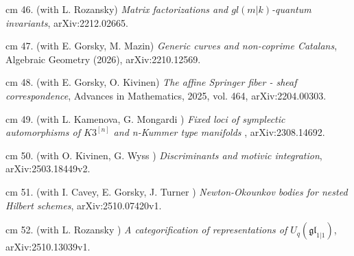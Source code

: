 \documentclass[11pt]{amsart}
\theoremstyle{plain}
\theoremstyle{definition}
\theoremstyle{remark}
\begin{document}
\noindent{} cm 46. (with L. Rozansky)
{\it  Matrix factorizations and \(gl(m|k)\)-quantum invariants}, arXiv:2212.02665.

\noindent{} cm 47. (with E. Gorsky, M. Mazin)
{\it  Generic curves and non-coprime Catalans}, Algebraic Geometry (2026), arXiv:2210.12569.

\noindent{} cm 48. (with E. Gorsky, O. Kivinen)
{\it The affine Springer fiber - sheaf correspondence}, {Advances in Mathematics},
 2025,
  vol. 464, arXiv:2204.00303.

\noindent{} cm 49. (with L. Kamenova, G. Mongardi )
{\it Fixed loci of symplectic automorphisms of \(K3^{[n]}\) and n-Kummer type manifolds
}, arXiv:2308.14692.

\noindent{} cm 50. (with O. Kivinen, G. Wyss )
{\it Discriminants and motivic integration},
  arXiv:2503.18449v2.



\noindent{} cm 51. (with I. Cavey, E. Gorsky, J. Turner )
{\it Newton-Okounkov bodies for nested Hilbert schemes},
arXiv:2510.07420v1.




\noindent{} cm 52. (with L. Rozansky )
{\it A categorification of representations of
                  $U_q(\mathfrak{gl}_{1|1})$},
 arXiv:2510.13039v1.
\end{document}
